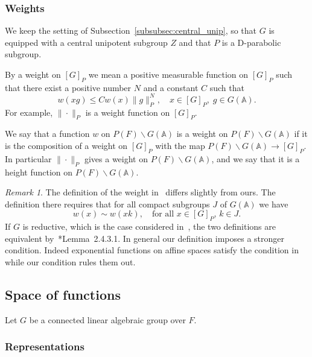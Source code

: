 \documentclass[letterpaper,11pt]{amsart}
\newcommand{\bA}{\mathbb{A}}
\newcommand{\bs}{\backslash}
\newcommand{\<}{\negthickspace}
\providecommand{\aabs}[1]{\lVert#1\rVert}
\theoremstyle{definition}
\theoremstyle{plain}
\theoremstyle{remark}
\newtheorem{remark}[definition]{Remark}
\numberwithin{equation}{section}
\begin{document}
\subsubsection{Weights}
We keep the setting of Subsection~\ref{subsubsec:central_unip}, so that $G$ is equipped with a central unipotent subgroup $Z$ and that $P$ is a D-parabolic subgroup.

By a weight on $[G]_{P}$ we mean a positive measurable function on $[G]_{P}$
such that there exist a positive number $N$ and a constant $C$ such that
    \begin{equation} \label{eq:weight_on_[G]_P}
        w(xg) \leq C w(x) \aabs{g}_P^N, \quad
   x \in [G]_P, \; g\in G(\bA).
    \end{equation}
For example, $\| \cdot \|_{P}$ is a weight function on $[G]_{P}$.

We say that a function $w$ on $P(F) \bs G(\bA)$ is a weight on
$P(F) \bs G(\bA)$ if it is the composition of a weight on $[G]_P$ with the
map $P(F) \bs G(\bA) \to [G]_P$. In particular $\| \cdot \|_P$ gives a
weight on $P(F) \bs G(\bA)$, and we say that it is a height function on $P(F) \bs
G(\bA)$.

\begin{remark}
The definition of the weight in~\cite{BPCZ} differs slightly from ours. The
definition there requires that for all compact subgroups $J$ of $G(\bA)$ we have
    \[
    w(x) \sim w(xk), \quad \text{for all $x \in [G]_P$, $k \in J$}.
    \]
If $G$ is reductive, which is the case considered in~\cite{BPCZ}, the two
definitions are equivalent by~\cite{BPCZ}*{Lemma~2.4.3.1}. In general our
definition imposes a stronger condition. Indeed
exponential functions on affine spaces satisfy the condition in~\cite{BPCZ}
while our condition rules them out.
\end{remark}

\subsection{Space of functions} \label{subsec:spaces_of_function}
Let $G$ be a connected linear algebraic group over $F$.

\subsubsection{Representations}
\end{document}
